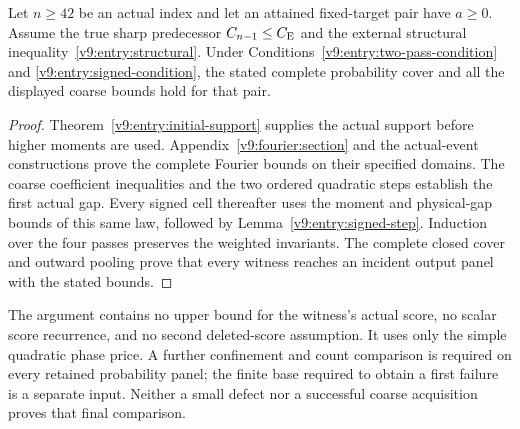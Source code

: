 \begin{theorem}\label{v9:entry:theorem}
Let $n\ge42$ be an actual index and let an attained fixed-target pair
have $a\ge0$. Assume the true sharp predecessor $C_{n-1}\le C_{\mathrm E}$ and
the external structural inequality~\eqref{v9:entry:structural}.
Under Conditions~\ref{v9:entry:two-pass-condition} and
\ref{v9:entry:signed-condition}, the stated complete probability cover
and all the displayed coarse bounds hold for that pair.
\end{theorem}
\begin{proof}
Theorem~\ref{v9:entry:initial-support} supplies the actual support before
higher moments are used. Appendix~\ref{v9:fourier:section} and the
actual-event constructions prove the complete Fourier bounds on their
specified domains. The coarse coefficient inequalities and the two
ordered quadratic steps establish the first actual gap. Every signed
cell thereafter uses the moment and physical-gap bounds of this same
law, followed by Lemma~\ref{v9:entry:signed-step}. Induction over the
four passes preserves the weighted invariants. The complete closed
cover and outward pooling prove that every witness reaches an incident
output panel with the stated bounds.
\end{proof}
The argument contains no upper bound for the witness's actual score,
no scalar score recurrence, and no second deleted-score assumption.
It uses only the simple quadratic phase price. A further confinement
and count comparison is required on every retained probability panel;
the finite base required to obtain a first failure is a separate input.
Neither a small defect nor a successful coarse acquisition proves that
final comparison.
